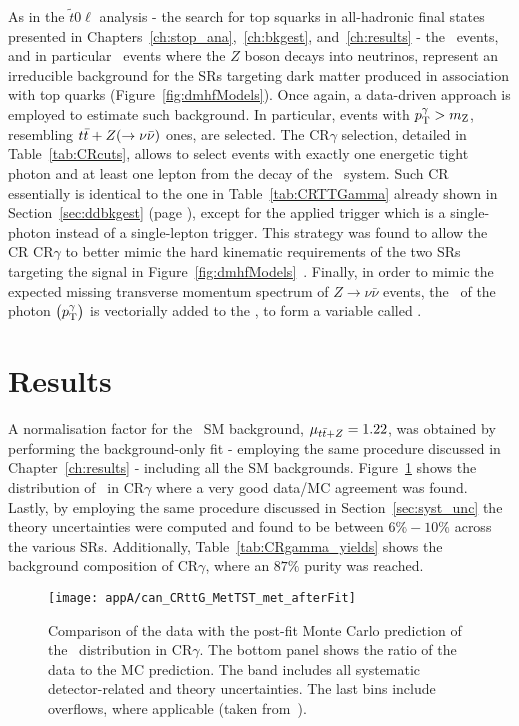 		As in the $\tilde{t}0\ell$ analysis - the search for top squarks in all-hadronic final states presented in Chapters~\ref{ch:stop_ana},~\ref{ch:bkgest}, and~\ref{ch:results} - the \ttV\ events, and in particular \ttZ\ events where the $Z$ boson decays into neutrinos, represent an irreducible background for the \acp{SR} targeting dark matter produced in association with top quarks (Figure~\ref{fig:dmhfModels}). Once again, a data-driven approach is employed to estimate such background. In particular, events with $p_{\mathrm{T}}^{\gamma} > m_{\mathrm Z}$, resembling $t\bar{t}+Z( \rightarrow \nu\bar{\nu})$ ones, are selected. The CR${\gamma}$ selection, detailed in Table~\ref{tab:CRcuts}, allows to select events with exactly one energetic tight photon and at least one lepton from the decay of the \ttbar\ system. Such \ac{CR} essentially is identical to the one in Table~\ref{tab:CRTTGamma} already shown in Section~\ref{sec:ddbkgest} (page \pageref{sec:ddbkgest}), except for the applied trigger which is a single-photon instead of a single-lepton trigger. This strategy was found to allow the \ac{CR} CR$\gamma$ to better mimic the hard kinematic requirements of the two \acp{SR} targeting the signal in Figure~\ref{fig:dmhfModels}~\cite{DMhf}. Finally, in order to mimic the expected missing transverse momentum spectrum of $Z\rightarrow\nu\bar{\nu}$ events, the \pt\ of the photon $\left ( p_{\mathrm{T}}^{\gamma} \right )$ is vectorially added to the \ptmiss, to form a variable called \metprimeg.



	\section{Results}

		A normalisation factor for the \ttZ\ \ac{SM} background, $\mu_{t\bar{t}+Z} = 1.22$, was obtained by performing the background-only fit - employing the same procedure discussed in Chapter~\ref{ch:results} - including all the \ac{SM} backgrounds. Figure~\ref{fig:metprimecrgamma} shows the distribution of \metprimeg\ in CR$\gamma$ where a very good data/MC agreement was found. Lastly, by employing the same procedure discussed in Section~\ref{sec:syst_unc} the theory uncertainties were computed and found to be between $6\%-10\%$ across the various \acp{SR}. Additionally, Table~\ref{tab:CRgamma_yields} shows the background composition of CR$\gamma$, where an $87\%$ purity was reached.

		\begin{figure}[!htb]
		\centering
			\texttt{[image: appA/can\_CRttG\_MetTST\_met\_afterFit]}
			\caption{Comparison of the data with the post-fit Monte Carlo prediction of the \metprimeg\ distribution in CR$\gamma$. The bottom panel shows the ratio of the data to the \ac{MC} prediction. The band includes all systematic
			detector-related and theory uncertainties. The last bins include overflows, where applicable (taken from~\cite{DMhf}).}
			\label{fig:metprimecrgamma}
		\end{figure}

